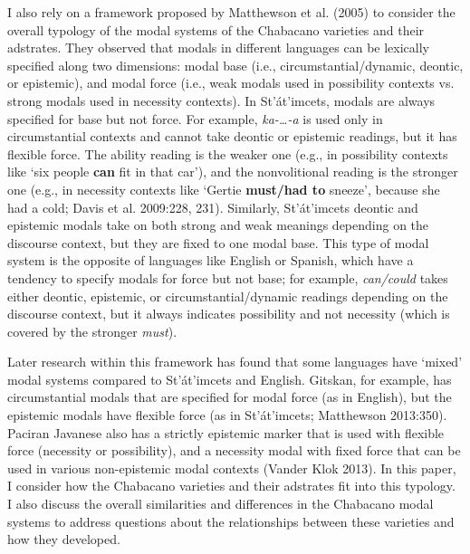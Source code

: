 \documentclass[12pt]{article}
\newenvironment{styleStandard}{\setlength\leftskip{0cm}\setlength\rightskip{0cm plus 1fil}\setlength\parindent{0cm}\setlength\parfillskip{0pt plus 1fil}\setlength\parskip{0in plus 1pt}\writerlistparindent\writerlistleftskip\leavevmode\normalfont\normalsize\writerlistlabel\ignorespaces}{\unskip\vspace{0.111in plus 0.0111in}\par}
\newcommand\writerlistleftskip{}
\newcommand\writerlistparindent{}
\newcommand\writerlistlabel{}
\begin{document}
\begin{styleStandard}
I also rely on a framework proposed by Matthewson et al. (2005) to consider the overall typology of the modal systems of the Chabacano varieties and their adstrates. They observed that modals in different languages can be lexically specified along two dimensions: modal base (i.e., circumstantial/dynamic, deontic, or epistemic), and modal force (i.e., weak modals used in possibility contexts vs. strong modals used in necessity contexts). In St’át’imcets, modals are always specified for base but not force. For example, \textit{ka-…-a} is used only in circumstantial contexts and cannot take deontic or epistemic readings, but it has flexible force. The ability reading is the weaker one (e.g., in possibility contexts like ‘six people \textbf{can} fit in that car’), and the nonvolitional reading is the stronger one (e.g., in necessity contexts like ‘Gertie \textbf{must/had to} sneeze’, because she had a cold; Davis et al. 2009:228, 231). Similarly, St’át’imcets deontic and epistemic modals take on both strong and weak meanings depending on the discourse context, but they are fixed to one modal base. This type of modal system is the opposite of languages like English or Spanish, which have a tendency to specify modals for force but not base; for example, \textit{can/could }takes either deontic, epistemic, or circumstantial/dynamic readings depending on the discourse context, but it always indicates possibility and not necessity (which is covered by the stronger \textit{must}).
\end{styleStandard}

\begin{styleStandard}
Later research within this framework has found that some languages have ‘mixed’ modal systems compared to St’át’imcets and English. Gitskan, for example, has circumstantial modals that are specified for modal force (as in English), but the epistemic modals have flexible force (as in St’át’imcets; Matthewson 2013:350). Paciran Javanese also has a strictly epistemic marker that is used with flexible force (necessity or possibility), and a necessity modal with fixed force that can be used in various non-epistemic modal contexts (Vander Klok 2013). In this paper, I consider how the Chabacano varieties and their adstrates fit into this typology. I also discuss the overall similarities and differences in the Chabacano modal systems to address questions about the relationships between these varieties and how they developed.
\end{styleStandard}
\end{document}
